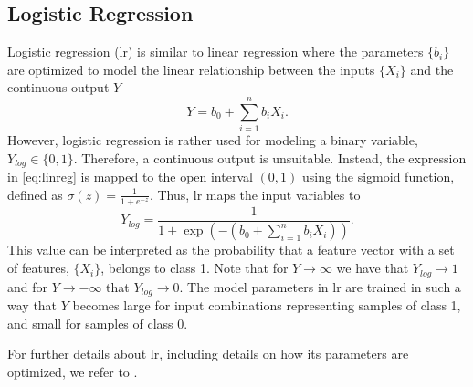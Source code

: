 \subsection{Logistic Regression}
Logistic regression (\gls{lr}) is similar to linear regression where the parameters $\{b_i\}$ are optimized to model the linear relationship between the inputs $\{X_i\}$ and the continuous output $Y$
\begin{equation}
\label{eq:linreg}
	Y= b_0+\sum_{i=1}^n b_iX_i.
\end{equation}
However, logistic regression is rather used for modeling a binary variable, $Y_{log}\in\{0,1\}$. Therefore, a continuous output is unsuitable. Instead, the expression in \eqref{eq:linreg} is mapped to the open interval $(0,1)$ using the sigmoid function, defined as $\sigma(z)=\frac{1}{1+e^{-z}}$. Thus, \gls{lr} maps the input variables to
\begin{equation}
\label{eq:log_eq}
	Y_{log}= \frac{1}{1+\exp(-(b_0 + \sum_{i=1}^n b_iX_i))}.
\end{equation}
This value can be interpreted as the probability that a feature vector with a set of features, $\{X_i\}$, belongs to class 1. Note that for $Y\rightarrow \infty$ we have that $Y_{log}\rightarrow 1$ and for $Y\rightarrow -\infty$ that $Y_{log}\rightarrow 0$. The model parameters in \gls{lr} are trained in such a way that $Y$ becomes large for input combinations representing samples of class 1, and small for samples of class 0. 

For further details about \gls{lr}, including details on how its parameters are optimized, we refer to \citep{shalev-shwartz_ben-david_2016}.





